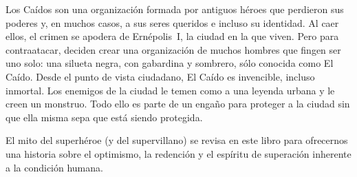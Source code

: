 Los Caídos son una organización formada por antiguos héroes que perdieron sus poderes y, en muchos casos, a sus seres queridos e incluso su identidad. Al caer ellos, el crimen se apodera de Ernépolis~I, la ciudad en la que viven. Pero para contraatacar, deciden crear una organización de muchos hombres que fingen ser uno solo: una silueta negra, con gabardina y sombrero, sólo conocida como El Caído. Desde el punto de vista ciudadano, El Caído es invencible, incluso inmortal. Los enemigos de la ciudad le temen como a una leyenda urbana y le creen un monstruo. Todo ello es parte de un engaño para proteger a la ciudad sin que ella misma sepa que está siendo protegida.

El mito del superhéroe (y del supervillano) se revisa en este libro para ofrecernos una historia sobre el optimismo, la redención y el espíritu de superación inherente a la condición humana.